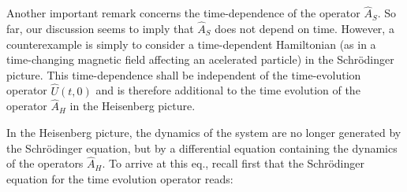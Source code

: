  Another important remark concerns the time-dependence of
 the operator $\hat{A}_S$. So far, our discussion seems to
 imply that $\hat{A}_S$ does not depend on time. However, a
 counterexample is simply to consider a time-dependent
 Hamiltonian (as in a time-changing magnetic field affecting
 an acelerated particle) in the Schrödinger picture. This
 time-dependence shall be independent of the time-evolution
 operator $\hat{U}(t,0)$ and is therefore additional to the
 time evolution of the operator $\hat{A}_H$ in the
 Heisenberg picture.

 In the Heisenberg picture, the dynamics of the system are
 no longer generated by the Schrödinger equation, but by a
 differential equation containing the dynamics of the
 operators $\hat{A}_H$. To arrive at this eq., recall first
 that the Schrödinger equation for the time evolution
 operator reads:
